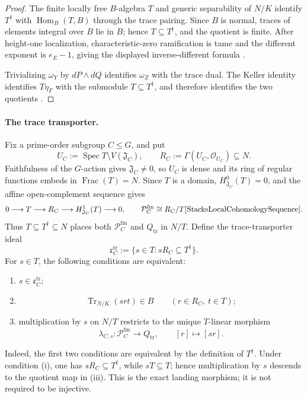 \documentclass[11pt]{article}
\theoremstyle{remark}
\theoremstyle{definition}
\DeclareMathOperator{\Spec}{Spec}
\DeclareMathOperator{\Frac}{Frac}
\begin{document}
\begin{proof}
The finite locally free \(B\)-algebra \(T\) and generic separability of
\(N/K\) identify \(T^\dagger\) with \(\operatorname{Hom}_B(T,B)\) through
the trace pairing.  Since \(B\) is normal, traces of elements integral over
\(B\) lie in \(B\); hence \(T\subseteq T^\dagger\), and the quotient is
finite.  After height-one localization, characteristic-zero ramification is
tame and the different exponent is \(e_E-1\), giving the displayed
inverse-different formula
\cite{StacksDedekindDifferent,StacksFiniteFlatDifferent}.

Trivializing \(\omega_Y\) by \(dP\wedge dQ\) identifies \(\omega_Z\) with
the trace dual.  The Keller identity identifies \(T\eta_F\) with the
submodule \(T\subseteq T^\dagger\), and therefore identifies the two
quotients \cite{StacksQuasiFiniteDualizing}.
\end{proof}

\paragraph{The trace transporter.}
Fix a prime-order subgroup \(C\leq G\), and put
\[
  U_C:=\Spec T\setminus V(\mathfrak J_C),
  \qquad
  R_C:=\Gamma(U_C,\mathcal O_{U_C})\subseteq N.
\]
Faithfulness of the \(G\)-action gives \(\mathfrak J_C\neq0\), so \(U_C\)
is dense and its ring of regular functions embeds in \(\Frac(T)=N\).
Since \(T\) is a domain, \(H^0_{\mathfrak J_C}(T)=0\), and the affine
open-complement sequence gives
\[
  0\longrightarrow T\longrightarrow R_C
  \longrightarrow H^1_{\mathfrak J_C}(T)\longrightarrow0,
  \qquad
  \mathcal P_C^{\mathrm{fm}}\cong R_C/T
  \cite{StacksLocalCohomologySequence}.
\]
Thus \(T\subseteq T^\dagger\subseteq N\) places both
\(\mathcal P_C^{\mathrm{fm}}\) and \(Q_{\mathrm{tr}}\) in \(N/T\).  Define
the trace-transporter ideal
\[
  \mathfrak c_C^{\mathrm{tr}}
  :=\{s\in T:sR_C\subseteq T^\dagger\}.
\]
For \(s\in T\), the following conditions are equivalent:
\begin{enumerate}[label=\textup{(\roman*)}]
  \item \(s\in\mathfrak c_C^{\mathrm{tr}}\);
  \item
  \[
    \operatorname{Tr}_{N/K}(srt)\in B
    \qquad(r\in R_C,\ t\in T);
  \]
  \item multiplication by \(s\) on \(N/T\) restricts to the unique
  \(T\)-linear morphism
  \[
    \lambda_{C,s}\colon\mathcal P_C^{\mathrm{fm}}\longrightarrow
    Q_{\mathrm{tr}},
    \qquad [r]\longmapsto[sr].
  \]
\end{enumerate}
Indeed, the first two conditions are equivalent by the definition of
\(T^\dagger\).  Under condition \textup{(i)}, one has
\(sR_C\subseteq T^\dagger\), while \(sT\subseteq T\); hence multiplication
by \(s\) descends to the quotient map in \textup{(iii)}.  This is the exact
landing morphism; it is not required to be injective.
\end{document}
